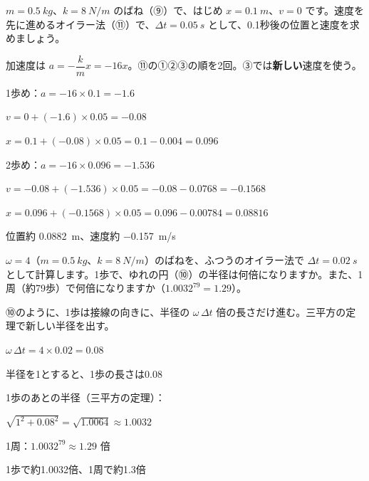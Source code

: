 \begin{reidai}
$m=\qty{0.5}{kg}$、$k=\qty{8}{N/m}$ のばね（⑨）で、はじめ $x=\qty{0.1}{m}$、$v=0$ です。速度を先に進めるオイラー法（⑪）で、$\Delta t=\qty{0.05}{s}$ として、0.1秒後の位置と速度を求めましょう。\par
\kangaekata 加速度は $a=-\dfrac{k}{m}x=-16x$。⑪の①②③の順を2回。③では\textbf{新しい}速度を使う。\par
\shiki 1歩め：$a=-16\times0.1=-1.6$\par
\bkvicl $v=0+(-1.6)\times0.05=-0.08$\par
\bkvicl $x=0.1+(-0.08)\times0.05=0.1-0.004=0.096$\par
\bkvicl 2歩め：$a=-16\times0.096=-1.536$\par
\bkvicl $v=-0.08+(-1.536)\times0.05=-0.08-0.0768=-0.1568$\par
\bkvicl $x=0.096+(-0.1568)\times0.05=0.096-0.00784=0.08816$\par
\kotae 位置約 \qty{0.0882}{m}、速度約 \qty{-0.157}{m/s}
\end{reidai}

\begin{reidai}[ふつうのオイラー法のふくらみ]
$\omega=4$（$m=\qty{0.5}{kg}$、$k=\qty{8}{N/m}$）のばねを、ふつうのオイラー法で $\Delta t=\qty{0.02}{s}$ として計算します。1歩で、ゆれの円（⑩）の半径は何倍になりますか。また、1周（約79歩）で何倍になりますか（$1.0032^{79}=1.29$）。\par
\kangaekata ⑩のように、1歩は接線の向きに、半径の $\omega\,\Delta t$ 倍の長さだけ進む。三平方の定理で新しい半径を出す。\par
\noindent\begin{minipage}[c]{0.66\linewidth}\raggedright
\shiki $\omega\,\Delta t=4\times0.02=0.08$\par
\bkvicl 半径を1とすると、1歩の長さは0.08\par
\bkvicl 1歩のあとの半径（三平方の定理）：\par
\bkvicl $\sqrt{1^2+0.08^2}=\sqrt{1.0064}\approx1.0032$\par
\bkvicl 1周：$1.0032^{79}\approx1.29$ 倍\par
\kotae 1歩で約1.0032倍、1周で約1.3倍
\end{minipage}\hfill
\begin{minipage}[c]{0.3\linewidth}\centering
{}
\end{minipage}
\end{reidai}


